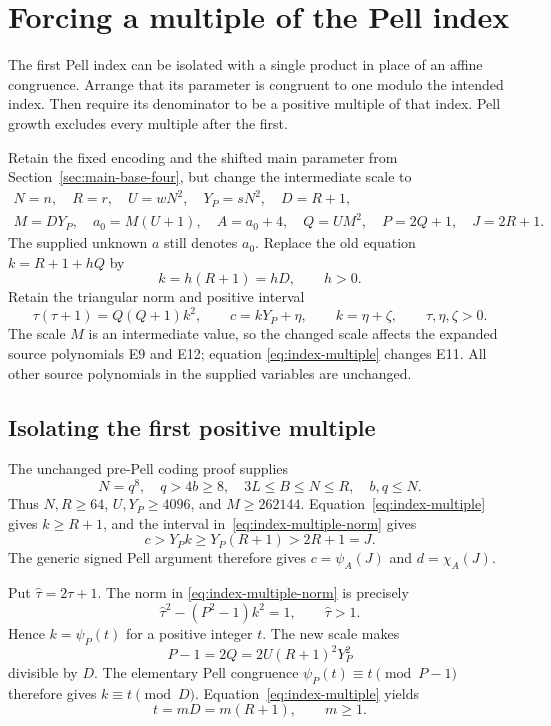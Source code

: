 \section{Forcing a multiple of the Pell index}
\label{sec:index-multiple}

The first Pell index can be isolated with a single product in place of
an affine congruence. Arrange that its parameter is congruent to one
modulo the intended index. Then require its denominator to be a
positive multiple of that index. Pell growth excludes every multiple
after the first.

Retain the fixed encoding and the shifted main parameter from
Section~\ref{sec:main-base-four}, but change the intermediate scale to
\[
\begin{gathered}
 N=n,\quad R=r,\quad U=wN^2,\quad Y_P=sN^2,\quad D=R+1,\\
 M=DY_P,\quad a_0=M(U+1),\quad A=a_0+4,
 \quad Q=UM^2,\quad P=2Q+1,\quad J=2R+1.
\end{gathered}
\]
The supplied unknown $a$ still denotes $a_0$. Replace the old equation
$k=R+1+hQ$ by
\begin{equation}\label{eq:index-multiple}
 k=h(R+1)=hD,\qquad h>0.
\end{equation}
Retain the triangular norm and positive interval
\begin{equation}\label{eq:index-multiple-norm}
 \tau(\tau+1)=Q(Q+1)k^2,\qquad
 c=kY_P+\eta,\qquad k=\eta+\zeta,
 \qquad \tau,\eta,\zeta>0.
\end{equation}
The scale $M$ is an intermediate value, so the changed scale affects
the expanded source polynomials E9 and E12; equation
\eqref{eq:index-multiple} changes E11. All other source polynomials
in the supplied variables are unchanged.

\subsection{Isolating the first positive multiple}

The unchanged pre-Pell coding proof supplies
\[
 N=q^8,\quad q>4b\ge8,\quad
 3L\le B\le N\le R,\quad b,q\le N.
\]
Thus $N,R\ge64$, $U,Y_P\ge4096$, and $M\ge262144$.
Equation~\eqref{eq:index-multiple} gives $k\ge R+1$, and the interval
in~\eqref{eq:index-multiple-norm} gives
\[
 c>Y_Pk\ge Y_P(R+1)>2R+1=J.
\]
The generic signed Pell argument therefore gives
$c=\psi_A(J)$ and $d=\chi_A(J)$.

Put $\widehat\tau=2\tau+1$. The norm in
\eqref{eq:index-multiple-norm} is precisely
\[
 \widehat\tau^2-(P^2-1)k^2=1,\qquad \widehat\tau>1.
\]
Hence $k=\psi_P(t)$ for a positive integer $t$.
The new scale makes
\[
 P-1=2Q=2U(R+1)^2Y_P^2
\]
divisible by $D$. The elementary Pell congruence
$\psi_P(t)\equiv t\pmod{P-1}$ therefore gives
$k\equiv t\pmod D$. Equation~\eqref{eq:index-multiple} yields
\begin{equation}\label{eq:index-positive-multiple}
 t=mD=m(R+1),\qquad m\ge1.
\end{equation}

